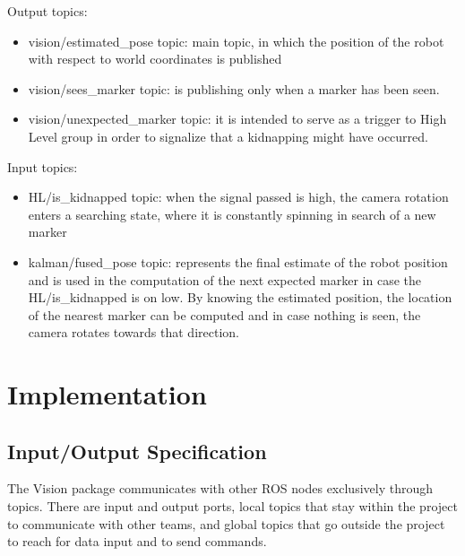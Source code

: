 \begin{description}
\item Output topics:
\begin{itemize}
\item vision/estimated\_pose topic: main topic, in which the position of the robot with respect to world coordinates is published
\item vision/sees\_marker topic: is publishing only when a marker has been seen. 
\item vision/unexpected\_marker  topic: it is intended to serve as a trigger to High Level group in order to signalize that a kidnapping might have occurred.
\end{itemize}
\item Input topics:
\begin{itemize}
\item HL/is\_kidnapped topic: when the signal passed is high, the camera rotation enters a searching state, where it is constantly spinning in search of a new marker
\item kalman/fused\_pose topic: represents the final estimate of the robot position and is used in the computation of the next expected marker in case the HL/is\_kidnapped is on low. By knowing the estimated position, the location of the nearest marker can be computed and in case nothing is seen, the camera rotates towards that direction.
\end{itemize}
\end{description}

\section{Implementation}

\subsection{Input/Output Specification}
The Vision package communicates with other ROS nodes exclusively through topics. There are input and output ports, local topics that stay within the project to communicate with other teams, and global topics that go outside the project to reach for data input and to send commands.

